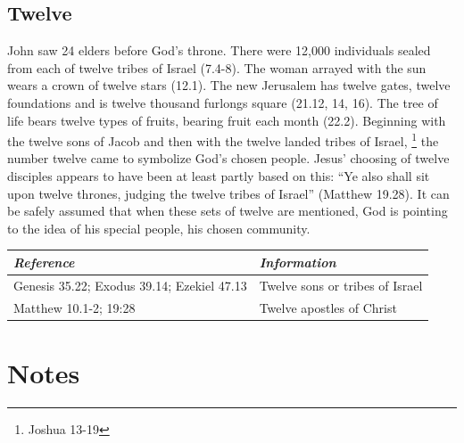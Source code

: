 \section*{Twelve}
John saw 24 elders before God's throne. There were 12,000 individuals sealed from each of twelve tribes of Israel (7.4-8). The woman arrayed with the sun wears a crown of twelve stars (12.1). The new Jerusalem has twelve gates, twelve foundations and is twelve thousand furlongs square (21.12, 14, 16). The tree of life bears twelve types of fruits, bearing fruit each month (22.2). 
\newline\newline
Beginning with the twelve sons of Jacob and then with the twelve landed tribes of Israel,%
\footnote{Joshua 13-19} %
the number twelve came to symbolize God's chosen people. Jesus' choosing of twelve disciples appears to have been at least partly based on this: ``Ye also shall sit upon twelve thrones, judging the twelve tribes of Israel'' (Matthew 19.28). 
\newline\newline
It can be safely assumed that when these sets of twelve are mentioned, God is pointing to the idea of his special people, his chosen community.
\newline\newline
\begin{tabularx}{\textwidth}{l X}
\toprule
\rowcolor{headergray}\emph{Reference} & \emph{Information}\\ 
\midrule
Genesis 35.22; Exodus 39.14; Ezekiel 47.13 & Twelve sons or tribes of Israel \\
\addlinespace
Matthew 10.1-2; 19:28 & Twelve apostles of Christ \\
\bottomrule
\end{tabularx}

\printindex[gen]
\chapter{Notes}
\fancyhead{} %
\newpage\mbox{}\cleardoublepage
\newpage\mbox{}\cleardoublepage
\renewcommand*{\BRbooktitlestyle}[1]{\textbf{#1}\nopagebreak}
\clearpage
{}
\fancyhead{} %
\printindex[scr]

